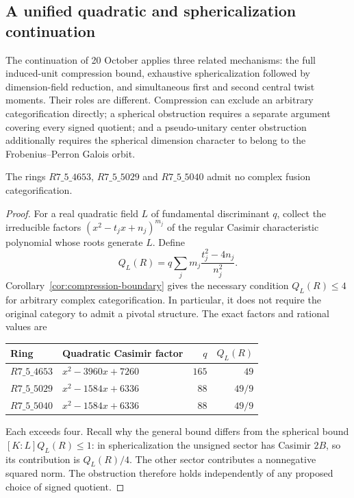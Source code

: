 \subsection{A unified quadratic and sphericalization continuation}
\label{sec:m5-quadratic-continuation}
The continuation of 20 October applies three related mechanisms: the
full induced-unit compression bound, exhaustive sphericalization followed
by dimension-field reduction, and simultaneous first and second central
twist moments.  Their roles are different.  Compression can exclude an
arbitrary categorification directly; a spherical obstruction requires a
separate argument covering every signed quotient; and a pseudo-unitary
center obstruction additionally requires the spherical dimension
character to belong to the Frobenius--Perron Galois orbit.

\begin{proposition}\label{prop:m5-direct-compression}
The rings $R7\_5\_4653$, $R7\_5\_5029$ and $R7\_5\_5040$
admit no complex fusion categorification.
\end{proposition}
\begin{proof}
For a real quadratic field $L$ of fundamental discriminant $q$, collect
the irreducible factors $(x^2-t_jx+n_j)^{m_j}$ of the regular Casimir
characteristic polynomial whose roots generate $L$.  Define
\[
 Q_L(R)=q\sum_j m_j\frac{t_j^2-4n_j}{n_j^2}.
\]
Corollary~\ref{cor:compression-boundary} gives the necessary condition
$Q_L(R)\leq4$ for arbitrary complex categorification.  In particular, it
does not require the original category to admit a pivotal structure.
The exact factors and rational values are
\begin{center}\small
\begin{tabular}{@{}l l r r@{}}
\toprule
Ring & Quadratic Casimir factor & $q$ & $Q_L(R)$\\
\midrule
$R7\_5\_4653$ & $x^2-3960x+7260$ & $165$ & $49$\\
$R7\_5\_5029$ & $x^2-1584x+6336$ & $88$ & $49/9$\\
$R7\_5\_5040$ & $x^2-1584x+6336$ & $88$ & $49/9$\\
\bottomrule
\end{tabular}
\end{center}
Each exceeds four.  Recall why the general bound differs from the
spherical bound $[K:L]Q_L(R)\leq1$: in sphericalization the unsigned
sector has Casimir $2B$, so its contribution is $Q_L(R)/4$.  The other
sector contributes a nonnegative squared norm.  The obstruction therefore
holds independently of any proposed choice of signed quotient.
\end{proof}

